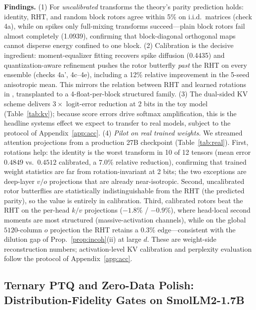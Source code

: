 \documentclass{article}
\begin{document}
\textbf{Findings.} (1) For \emph{uncalibrated} transforms the theory's parity
prediction holds: identity, RHT, and random block rotors agree within 5\% on
i.i.d.\ matrices (check 4a), while on spikes only full-mixing transforms
succeed---plain block rotors fail almost completely (1.0939), confirming that
block-diagonal orthogonal maps cannot disperse energy confined to one block.
(2) Calibration is the decisive ingredient: moment-equalizer fitting
recovers spike diffusion (0.4435) and quantization-aware refinement pushes the
rotor butterfly \emph{past} the RHT on every ensemble (checks 4a', 4c--4e),
including a 12\% relative improvement in the 5-seed anisotropic mean. This
mirrors the relation between RHT and learned rotations in
\citet{liu2024spinquant}, transplanted to a 4-float-per-block structured
family. (3) The dual-sided KV scheme delivers $3\times$ logit-error reduction
at 2 bits in the toy model (Table~\ref{tab:kv}); because score errors drive
softmax amplification, this is the headline systems effect we expect to
transfer to real models, subject to the protocol of Appendix~\ref{app:acc}.
(4) \emph{Pilot on real trained weights.} We streamed attention projections
from a production 27B checkpoint (Table~\ref{tab:real}). First, rotations
help: the identity is the worst transform in 10 of 12 tensors (mean error
$0.4849$ vs.\ $0.4512$ calibrated, a $7.0\%$ relative reduction), confirming
that trained weight statistics are far from rotation-invariant at 2 bits; the
two exceptions are deep-layer $v/o$ projections that are already near-isotropic.
Second, uncalibrated rotor butterflies are statistically indistinguishable
from the RHT (the predicted parity), so the value is entirely in calibration.
Third, calibrated rotors beat the RHT on the per-head $k/v$ projections
($-1.8\%$ / $-0.9\%$), where head-local second moments are most structured
(massive-activation channels), while on the global $5120$-column $o$
projection the RHT retains a $0.3\%$ edge---consistent with the dilution gap
of Prop.~\ref{prop:incoh}(ii) at large $d$. These are weight-side
reconstruction numbers; activation-level KV calibration and perplexity
evaluation follow the protocol of Appendix~\ref{app:acc}.

\subsection{Ternary PTQ and Zero-Data Polish: Distribution-Fidelity Gates on SmolLM2-1.7B}
\label{sec:klgates}
\end{document}
